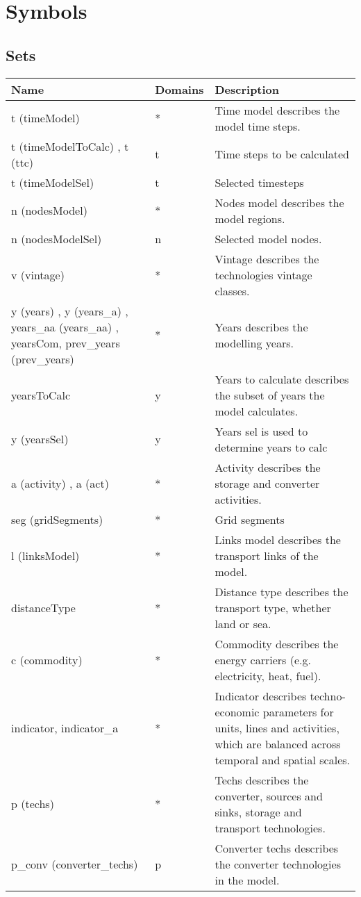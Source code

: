 \documentclass[11pt]{article}
\begin{document}
\section*{Symbols}
\subsection*{Sets}
\begin{tabularx}{\textwidth}{| l | l | X |} 
\hline 
\textbf{Name} & \textbf{Domains} & \textbf{Description}\\ 
\hline 
\endhead 
t (timeModel)  & * & Time model describes the model time steps. \\ 
t (timeModelToCalc) , t (ttc)  & t & Time steps to be calculated \\ 
t (timeModelSel)  & t & Selected timesteps \\ 
n (nodesModel)  & * & Nodes model describes the model regions. \\ 
n (nodesModelSel)  & n & Selected model nodes. \\ 
v (vintage)  & * & Vintage describes the technologies vintage classes. \\ 
y (years) , y (years\_a) , years_{aa} (years\_aa) , yearsCom, prev\_years (prev\_years)  & * & Years describes the modelling years. \\ 
yearsToCalc & y & Years to calculate describes the subset of years the model calculates. \\ 
y (yearsSel)  & y & Years sel is used to determine years to calc \\ 
a (activity) , a (act)  & * & Activity describes the storage and converter activities. \\ 
seg (gridSegments)  & * & Grid segments \\ 
l (linksModel)  & * & Links model describes the transport links of the model.  \\ 
distanceType & * &  Distance type describes the transport type, whether land or sea. \\ 
c (commodity)  & * & Commodity describes the energy carriers (e.g. electricity, heat, fuel). \\ 
indicator, indicator\_a & * & Indicator describes techno-economic parameters for units, lines and activities, which are balanced across temporal and spatial scales. \\ 
p (techs)  & * & Techs describes the converter, sources and sinks, storage and transport technologies. \\ 
p\_conv (converter\_techs)  & p & Converter techs describes the converter technologies in the model. \\ 

\end{tabularx}
\end{document}
